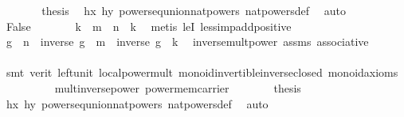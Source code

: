 \begin{isabellebody}
\ \ \ \ \isamarkupfalse%
\ \isamarkupfalse%
\ {\isacharquery}{\kern0pt}thesis\ \isamarkupfalse%
\ hx\ hy\ powers{\isacharunderscore}{\kern0pt}eq{\isacharunderscore}{\kern0pt}union{\isacharunderscore}{\kern0pt}nat{\isacharunderscore}{\kern0pt}powers\ nat{\isacharunderscore}{\kern0pt}powers{\isacharunderscore}{\kern0pt}def\ \isamarkupfalse%
\ auto\isanewline
\ \ \isamarkupfalse%
\isanewline
\ \ \ \ \isamarkupfalse%
\ False\isanewline
\ \ \ \ \isamarkupfalse%
\ \isamarkupfalse%
\ k\ \ {\isachardoublequoteopen}m\ {\isacharequal}{\kern0pt}\ n\ {\isacharplus}{\kern0pt}\ k{\isachardoublequoteclose}\ \isamarkupfalse%
\ {\isacharparenleft}{\kern0pt}metis\ leI\ less{\isacharunderscore}{\kern0pt}imp{\isacharunderscore}{\kern0pt}add{\isacharunderscore}{\kern0pt}positive{\isacharparenright}{\kern0pt}\isanewline
\ \ \ \ \isamarkupfalse%
\ \isamarkupfalse%
\ {\isachardoublequoteopen}g\ {\isacharcircum}{\kern0pt}\ n\ {\isasymcdot}\ {\isacharparenleft}{\kern0pt}inverse\ g{\isacharparenright}{\kern0pt}\ {\isacharcircum}{\kern0pt}\ m\ {\isacharequal}{\kern0pt}\ {\isacharparenleft}{\kern0pt}inverse\ g{\isacharparenright}{\kern0pt}\ {\isacharcircum}{\kern0pt}\ k{\isachardoublequoteclose}\ \isamarkupfalse%
\ inverse{\isacharunderscore}{\kern0pt}mult{\isacharunderscore}{\kern0pt}power\ assms\ associative\ \isanewline
\ \ \ \ \ \ \isamarkupfalse%
\ {\isacharparenleft}{\kern0pt}smt\ {\isacharparenleft}{\kern0pt}verit{\isacharparenright}{\kern0pt}\ left{\isacharunderscore}{\kern0pt}unit\ local{\isachardot}{\kern0pt}power{\isacharunderscore}{\kern0pt}mult\ monoid{\isachardot}{\kern0pt}invertible{\isacharunderscore}{\kern0pt}inverse{\isacharunderscore}{\kern0pt}closed\ monoid{\isacharunderscore}{\kern0pt}axioms\ \isanewline
\ \ \ \ \ \ \ \ mult{\isacharunderscore}{\kern0pt}inverse{\isacharunderscore}{\kern0pt}power\ power{\isacharunderscore}{\kern0pt}mem{\isacharunderscore}{\kern0pt}carrier{\isacharparenright}{\kern0pt}\isanewline
\ \ \ \ \isamarkupfalse%
\ \isamarkupfalse%
\ {\isacharquery}{\kern0pt}thesis\ \isamarkupfalse%
\ hx\ hy\ powers{\isacharunderscore}{\kern0pt}eq{\isacharunderscore}{\kern0pt}union{\isacharunderscore}{\kern0pt}nat{\isacharunderscore}{\kern0pt}powers\ nat{\isacharunderscore}{\kern0pt}powers{\isacharunderscore}{\kern0pt}def\ \isamarkupfalse%
\ auto\isanewline

\end{isabellebody}
